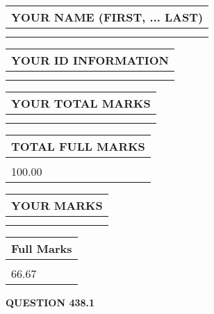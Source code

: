 \documentclass{ctexart}
\begin{document}
   
   
   
\newpage 
\setcounter{page}{ 
   438001 } 
   
   
   
   
\noindent\begin{tabular}{|l|}
\hline
YOUR NAME (FIRST, ... LAST)  \\
\hline
 \\ 
 \\ 
\hline
\end{tabular}
\hspace{0.05in} \begin{tabular}{|l|}
\hline
 YOUR   ID   INFORMATION  \\
\hline
 \\ 
 \\ 
\hline
\end{tabular}
   
   
\vspace{0.2in}\noindent\begin{tabular}{|l|}
\hline
YOUR TOTAL MARKS  \\
\hline
 \\ 
 \\ 
\hline
\end{tabular}
\hspace{0.05in} \begin{tabular}{|l|}
\hline
TOTAL FULL MARKS  \\
\hline
 \\ 
100.00 \\
\hline
\end{tabular}
   
   
 \vspace{0.2in}
 
 
 
 
   
   
  
\vspace{0.2in}
  
\noindent\begin{tabular}{|l|}
\hline
 YOUR MARKS  \\
\hline
 \\ 
 \\ 
\hline
\end{tabular}
\hspace{0.05in} \begin{tabular}{|l|}
\hline
 Full Marks  \\
\hline
 \\ 
66.67 \\
\hline
\end{tabular}
{\textbf{\Large{QUESTION
438.1 
}}}
  
\end{document}
